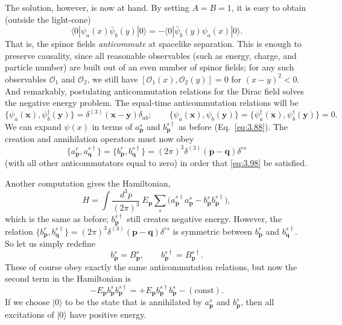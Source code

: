 The solution, however, is now at hand.  By setting $A = B = 1$, it is easy to
obtain (outside the light-cone)
\begin{equation}
  \langle 0|\psi_a(x)\bar{\psi}_b(y)|0\rangle
    = -\langle 0|\bar{\psi}_b(y)\psi_a(x)|0\rangle .
\end{equation}
That is, the spinor fields \emph{anticommute} at spacelike separation.  This
is enough to preserve causality, since all reasonable observables (such as
energy, charge, and particle number) are built out of an even number of
spinor fields; for any such observables $\mathcal{O}_1$ and $\mathcal{O}_2$,
we still have $[\mathcal{O}_1(x), \mathcal{O}_2(y)] = 0$ for
$(x-y)^2<0$.  And remarkably, postulating anticommutation relations for the
Dirac field solves the negative energy problem.  The equal-time
anticommutation relations will be
\begin{equation}
  \{\psi_a(\mathbf{x}), \psi_b^\dagger(\mathbf{y})\}
    = \delta^{(3)}(\mathbf{x}-\mathbf{y})\delta_{ab};
  \qquad
  \{\psi_a(\mathbf{x}), \psi_b(\mathbf{y})\}
  = \{\psi_a^\dagger(\mathbf{x}), \psi_b^\dagger(\mathbf{y})\} = 0 .
  \label{eq:3.98}
\end{equation}
We can expand $\psi(x)$ in terms of $a_{\mathbf{p}}^s$ and $b_{\mathbf{p}}^{s\dagger}$
as before (Eq.~\eqref{eq:3.88}).  The creation and annihilation operators
must now obey
\begin{equation}
  \{a_{\mathbf{p}}^r, a_{\mathbf{q}}^{s\dagger}\}
  = \{b_{\mathbf{p}}^r, b_{\mathbf{q}}^{s\dagger}\}
    = (2\pi)^3\delta^{(3)}(\mathbf{p}-\mathbf{q})\delta^{rs}
  \label{eq:3.99}
\end{equation}
(with all other anticommutators equal to zero) in order that \eqref{eq:3.98}
be satisfied.

Another computation gives the Hamiltonian,
\begin{equation}
  H = \int \frac{d^3p}{(2\pi)^3}\ E_{\mathbf{p}}
    \sum_s \bigl( a_{\mathbf{p}}^{s\dagger}a_{\mathbf{p}}^s
      - b_{\mathbf{p}}^s b_{\mathbf{p}}^{s\dagger} \bigr),
\end{equation}
which is the same as before; $b_{\mathbf{p}}^{s\dagger}$ still creates
negative energy.  However, the relation
$\{b_{\mathbf{p}}^r, b_{\mathbf{q}}^{s\dagger}\}
= (2\pi)^3\delta^{(3)}(\mathbf{p}-\mathbf{q})\delta^{rs}$ is symmetric
between $b_{\mathbf{p}}^r$ and $b_{\mathbf{q}}^{s\dagger}$.  So let us simply
redefine
\begin{equation}
  b_{\mathbf{p}}^s = B_{\mathbf{p}}^s,\qquad
  b_{\mathbf{p}}^{s\dagger} = B_{\mathbf{p}}^{s\dagger} .
  \label{eq:3.100}
\end{equation}
These of course obey exactly the same anticommutation relations, but now the
second term in the Hamiltonian is
\begin{equation}
  -E_{\mathbf{p}}b_{\mathbf{p}}^s b_{\mathbf{p}}^{s\dagger}
    = +E_{\mathbf{p}}b_{\mathbf{p}}^{s\dagger}b_{\mathbf{p}}^s
      - (\text{const}).
\end{equation}
If we choose $|0\rangle$ to be the state that is annihilated by
$a_{\mathbf{p}}^s$ and $b_{\mathbf{p}}^s$, then all excitations of $|0\rangle$
have positive energy.

